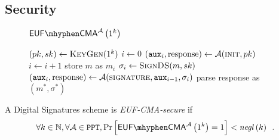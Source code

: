   \subsection{Security}
    \begin{figure}[H]
      \begin{gamebox}{$\mathsf{EUF \mhyphen CMA}^{\adversary}\left(1^k\right)$}
        \begin{algorithmic}[1]
          \State $(pk, sk) \gets \textsc{KeyGen}(1^k)$
          \State $i \gets 0$
          \State $(\mathtt{aux}_i, \mathrm{response}) \gets
          \mathcal{A}(\textsc{init}, pk)$
            \State $i \gets i + 1$
            \State store $m$ as $m_i$
            \State $\sigma_i \gets \textsc{SignDS}(m, sk)$
            \State $(\mathtt{aux}_i, \mathrm{response}) \gets
            \mathcal{A}(\textsc{signature}, \mathtt{aux}_{i-1}, \sigma_i)$
          \EndWhile
          \State parse response as $(m^*, \sigma^*)$
            \State {}
          \Else
            \State {}
          \EndIf
        \end{algorithmic}
      \end{gamebox}
      \caption{}
      \label{game:ds}
    \end{figure}
    \begin{definition}
      \label{def:ds:secure}
      A Digital Signatures scheme is \emph{\textsf{EUF-CMA}-secure} if
      \begin{equation*}
        \forall k \in \mathbb{N}, \forall \adversary \in \mathtt{PPT},
        \Pr\left[\mathsf{EUF \mhyphen CMA}^{\adversary}\left(1^k\right) =
        1\right] < \mathit{negl}\left(k\right) \enspace.
      \end{equation*}
    \end{definition}
